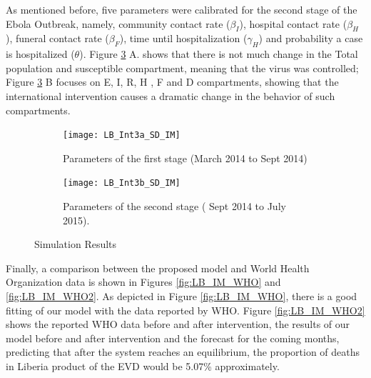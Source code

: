 \noindent As mentioned before, five parameters were calibrated for the second stage of the Ebola Outbreak, namely, community contact rate ($\beta_I$), hospital contact rate ($\beta_H$), funeral contact rate ($\beta_F$), time until hospitalization ($\gamma_H$) and probability a case is hospitalized ($\theta$). Figure \ref{fig:LB_IM_In} A. shows that there is not much change in the Total population and susceptible compartment, meaning that the virus was controlled;  Figure \ref{fig:LB_IM_In} B focuses on E, I, R, H , F and D compartments, showing that the international intervention causes a dramatic change in the behavior of such compartments.


\begin{figure}[h!]
 \centering 
 \begin{subfigure}[b]{1\textwidth}
  \texttt{[image: LB\_Int3a\_SD\_IM]} \caption{ Parameters of the first stage (March 2014  to Sept 2014)} \label{fig:LB_IM_In1} \end{subfigure}
 \hspace{.1cm}
\begin{subfigure}[b]{1\textwidth}
 \texttt{[image: LB\_Int3b\_SD\_IM]} \caption{ Parameters of the second stage ( Sept 2014 to July 2015).} \label{fig:LB_IM_In2} \end{subfigure} \caption{Simulation Results}
\label{fig:LB_IM_In} 
\end{figure}






\noindent Finally, a comparison between the proposed model and World Health Organization data is shown in Figures \ref{fig:LB_IM_WHO} and \ref{fig:LB_IM_WHO2}. As depicted in Figure \ref{fig:LB_IM_WHO}, there is a good fitting of our model with the data reported by WHO. Figure \ref{fig:LB_IM_WHO2} shows  the reported WHO data before and after intervention, the results of our model before and after intervention and the forecast for the coming months, predicting that after the system reaches an equilibrium, the proportion of deaths in Liberia product of the EVD would be 5.07\% approximately.





